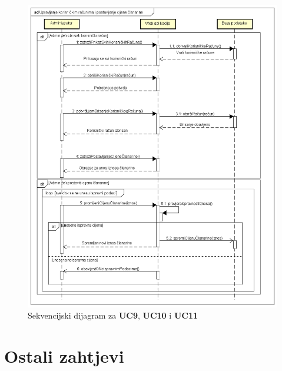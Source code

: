 				\begin{figure}[H]
					\includegraphics[width=\textwidth]{dijagrami/sd4.PNG}
					\centering
					\vspace{-1cm}
					\caption{Sekvencijski dijagram za \textbf{UC9}, \textbf{UC10} i \textbf{UC11}}
					\label{fig:promjene}
				\end{figure}
				
				\vspace{-0.6cm}
				
				\newpage
	
		\section{Ostali zahtjevi}
		
